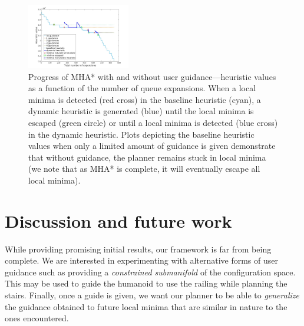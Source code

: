 \documentclass[conference]{IEEEtran}
\begin{document}
\begin{figure}[tb]
  \centering
  	\includegraphics[width=0.4\textwidth]{fig/heuristic_value.jpg}
  	\vspace{-2mm}
  \caption{
		Progress of MHA* with and without user guidance---heuristic values as a function of the number of queue expansions.
		When a local minima is detected (red cross) in the baseline heuristic (cyan), a dynamic heuristic is generated (blue) until the local minima is escaped (green circle) or until a local minima is detected (blue cross) in the dynamic heuristic.
		Plots depicting the baseline heuristic values when only a limited amount of guidance is given demonstrate that without guidance, the planner remains stuck in local minima (we note that as MHA* is complete, it will eventually escape all local minima).
		}
\vspace{-5mm}
   	\label{fig:res}
\end{figure}

\section{Discussion and future work}
\label{sec:future}

While providing promising initial results, our framework is far from being complete.
We are interested in experimenting with alternative forms of user guidance such as providing a \emph{constrained submanifold} of the configuration space. This may be used to guide the humanoid to use the railing while planning the stairs.
Finally, once a guide is given, we want our planner to be able to \emph{generalize} the guidance obtained to future local minima that are similar in nature to the ones encountered.


%


\end{document}
